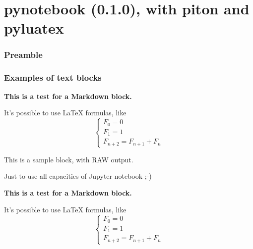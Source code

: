 \documentclass[a4paper,11pt]{article}
\def\PLver{0.1.0}
\begin{document}
\part*{pynotebook (\PLver), with piton and pyluatex}

\section{Preamble}


\section{Examples of text blocks}

\begin{codehigh}
\begin{NotebookPitonMarkdown}{\linewidth}
{\Large\bfseries This is a test for a \textsf{Markdown} block.}

It's possible to use \LaTeX{} formulas, like %
\[
  \left\lbrace\begin{array}{l}
    F_0 = 0\\
    F_1 = 1 \\
    F_{n+2} = F_{n+1} + F_n
  \end{array}\right.
\]
\end{NotebookPitonMarkdown}

\begin{NotebookPitonRaw}{\linewidth}
This is a sample block, with RAW output.

Just to use all capacities of Jupyter notebook ;-)
\end{NotebookPitonRaw}
\end{codehigh}

\begin{NotebookPitonMarkdown}{\linewidth}
{\Large\bfseries This is a test for a \textsf{Markdown} block.}

It's possible to use \LaTeX{} formulas, like %
\[
\left\lbrace\begin{array}{l}
F_0 = 0\\
F_1 = 1 \\
F_{n+2} = F_{n+1} + F_n
\end{array}\right.
\]
\end{NotebookPitonMarkdown}
\end{document}

